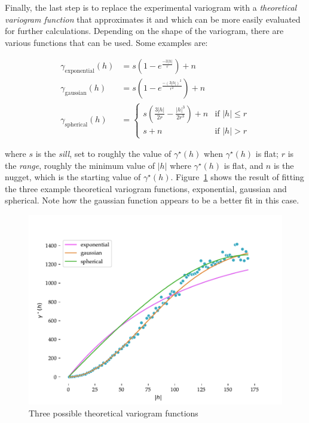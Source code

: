 Finally, the last step is to replace the experimental variogram with a \emph{theoretical variogram function} that approximates it and which can be more easily evaluated for further calculations.
Depending on the shape of the variogram, there are various functions that can be used.
Some examples are:

\begin{align}
\gamma_\mathrm{exponential}(h) &= s \left(1 - e^\frac{-3|h|}{r}\right) + n \\
\gamma_\mathrm{gaussian}(h) &= s \left(1 - e^\frac{-\left(3|h|\right)^2}{r^2}\right) + n \\
\gamma_\mathrm{spherical}(h) &= \begin{cases} 
   s \left(\frac{3|h|}{2r} - \frac{|h|^3}{2r^3}\right) + n & \text{if } |h| \leq r \\
   s + n & \text{if } |h| > r
  \end{cases}
\end{align}

where \(s\) is the \emph{sill}, set to roughly the value of \(\gamma^\star(h)\) when \(\gamma^\star(h)\) is  flat; \(r\) is the \emph{range}, roughly the minimum value of \(|h|\) where \(\gamma^\star(h)\) is flat, and \(n\) is the nugget, which is the starting value of \(\gamma^\star(h)\).
Figure~\ref{fig:theoretical_variogram} shows the result of fitting the three example theoretical variogram functions, exponential, gaussian and spherical.
Note how the gaussian function appears to be a better fit in this case.

\begin{figure}[htbp]
\centering
\includegraphics[width=0.8\linewidth]{figs/theoretical_variogram}
\caption{Three possible theoretical variogram functions}%
\label{fig:theoretical_variogram}
\end{figure}

